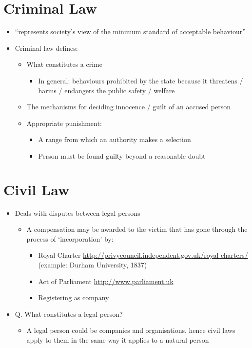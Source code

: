 \documentclass{article}
\begin{document}
\section{Criminal Law}
\begin{itemize}
\item ``represents society's view of the minimum standard of acceptable behaviour'' \cite{shears_james_2005}

\item Criminal law defines:
\begin{itemize}
\item What constitutes a crime
\begin{itemize}
\item In general: behaviours prohibited by the state because it threatens / harms / endangers the public safety / welfare
\end{itemize}
\item The mechanisms for deciding innocence / guilt of an accused person
\item Appropriate punishment:
\begin{itemize}
\item A range from which an authority makes a selection 
\item Person must be found guilty beyond a reasonable doubt
\end{itemize}
\end{itemize}
\end{itemize}




\section{Civil Law}
\begin{itemize}
\item Deals with disputes between legal persons
\begin{itemize}
\item A compensation may be awarded to the victim that has gone through the process of `incorporation' by:
\begin{itemize}
\item Royal Charter \url{http://privycouncil.independent.gov.uk/royal-charters/}
(example: Durham University, 1837)
\item Act of Parliament \url{http://www.parliament.uk}
\item Registering as company 
\end{itemize}
\end{itemize}

\item Q. What constitutes a legal person?

\begin{itemize}
\item A legal person could be companies and organisations, hence civil laws apply to them in the same way it applies to a natural person
\end{itemize}
\end{itemize}
\end{document}
